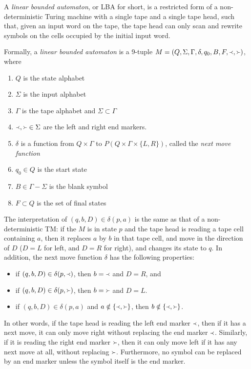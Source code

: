 \documentclass[12pt]{article}
\begin{document}
A \emph{linear bounded automaton}, or LBA for short, is a restricted form of a non-deterministic Turing machine with a single tape and a single tape head, such that, given an input word on the tape, the tape head can only scan and rewrite symbols on the cells occupied by the initial input word.

Formally, a \emph{linear bounded automaton} is a 9-tuple $M=(Q,\Sigma,\Gamma,\delta,q_0,B,F,\Yleft,\Yright)$, where
\begin{enumerate}
\item $Q$ is the state alphabet
\item $\Sigma$ is the input alphabet
\item $\Gamma$ is the tape alphabet and $\Sigma\subset\Gamma$
\item $\Yleft,\Yright \in \Sigma$ are the left and right end markers.
\item $\delta$ is a function from $Q\times \Gamma$ to $P(Q\times \Gamma\times \lbrace L,R\rbrace)$, called the \emph{next move function}
\item $q_0\in Q$ is the start state
\item $B\in \Gamma-\Sigma$ is the blank symbol
\item $F\subset Q$ is the set of final states
\end{enumerate}
The interpretation of $(q,b,D)\in \delta(p,a)$ is the same as that of a non-deterministic TM: if the $M$ is in state $p$ and the tape head is reading a tape cell containing $a$, then it replaces $a$ by $b$ in that tape cell, and move in the direction of $D$ ($D=L$ for left, and $D=R$ for right), and changes its state to $q$.  In addition, the next move function $\delta$ has the following properties: 
\begin{itemize}
\item if $(q,b,D)\in \delta(p,\Yleft)$, then $b=\Yleft$ and $D=R$, and 
\item if $(q,b,D)\in \delta(p,\Yright)$, then $b=\Yright$ and $D=L$.
\item if $(q,b,D)\in \delta(p,a)$ and $a\notin \lbrace \Yleft, \Yright\rbrace$, then $b \notin \lbrace \Yleft, \Yright\rbrace$.
\end{itemize}
In other words, if the tape head is reading the left end marker $\Yleft$, then if it has a next move, it can only move right without replacing the end marker $\Yleft$.  Similarly, if it is reading the right end marker $\Yright$, then it can only move left if it has any next move at all, without replacing $\Yright$.  Furthermore, no symbol can be replaced by an end marker unless the symbol itself is the end marker.
\end{document}
